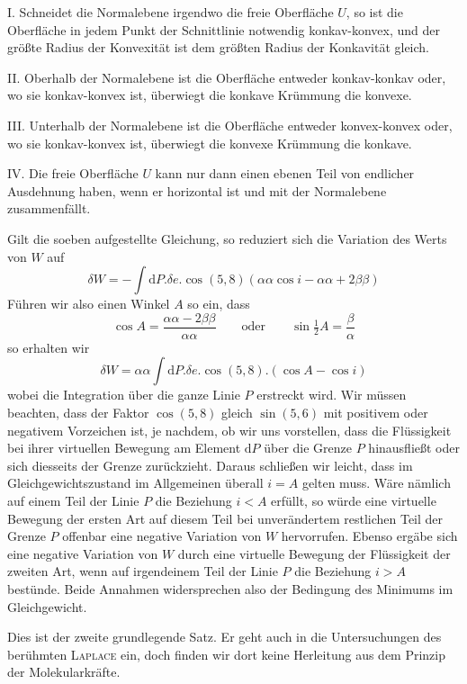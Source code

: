 I. Schneidet die Normalebene irgendwo die freie Oberfläche $U$, so ist die Oberfläche in jedem Punkt der Schnittlinie notwendig konkav-konvex, und der größte Radius der Konvexität ist dem größten Radius der Konkavität gleich.

II. Oberhalb der Normalebene ist die Oberfläche entweder konkav-konkav oder, wo sie konkav-konvex ist, überwiegt die konkave Krümmung die konvexe.

III. Unterhalb der Normalebene ist die Oberfläche entweder konvex-konvex oder, wo sie konkav-konvex ist, überwiegt die konvexe Krümmung die konkave.

IV. Die freie Oberfläche $U$ kann nur dann einen ebenen Teil von endlicher Ausdehnung haben, wenn er horizontal ist und mit der Normalebene zusammenfällt.

Gilt die soeben aufgestellte Gleichung, so reduziert sich die Variation des Werts von $W$ auf
\[
\delta W=-\int\mathrm{d}P.\delta e.\cos(5,8)(\alpha\alpha\cos i-\alpha\alpha+2\beta\beta)
\]
Führen wir also einen Winkel $A$ so ein, dass
\[
\cos A=\frac{\alpha\alpha-2\beta\beta}{\alpha\alpha}\qquad\text{oder}\qquad\sin\tfrac12 A=\frac\beta\alpha
\]
so erhalten wir
\[
\delta W=\alpha\alpha\int\mathrm{d}P.\delta e.\cos(5,8).(\cos A-\cos i)
\]
wobei die Integration über die ganze Linie $P$ erstreckt wird. Wir müssen beachten, dass der Faktor $\cos(5,8)$ gleich $\sin(5,6)$ mit positivem oder negativem Vorzeichen ist, je nachdem, ob wir uns vorstellen, dass die Flüssigkeit bei ihrer virtuellen Bewegung am Element $\mathrm{d}P$ über die Grenze $P$ hinausfließt oder sich diesseits der Grenze zurückzieht. Daraus schließen wir leicht, dass im Gleichgewichtszustand im Allgemeinen überall $i=A$ gelten muss. Wäre nämlich auf einem Teil der Linie $P$ die Beziehung $i<A$ erfüllt, so würde eine virtuelle Bewegung der ersten Art auf diesem Teil bei unverändertem restlichen Teil der Grenze $P$ offenbar eine negative Variation von $W$ hervorrufen. Ebenso ergäbe sich eine negative Variation von $W$ durch eine virtuelle Bewegung der Flüssigkeit der zweiten Art, wenn auf irgendeinem Teil der Linie $P$ die Beziehung $i>A$ bestünde. Beide Annahmen widersprechen also der Bedingung des Minimums im Gleichgewicht.

Dies ist der zweite grundlegende Satz. Er geht auch in die Untersuchungen des berühmten \textsc{Laplace} ein, doch finden wir dort keine Herleitung aus dem Prinzip der Molekularkräfte.

